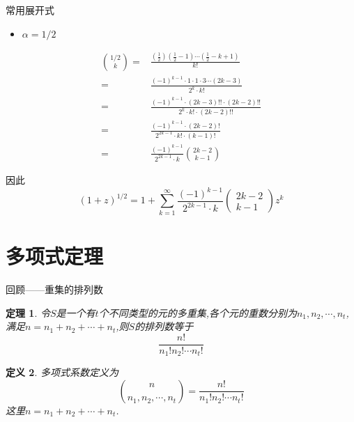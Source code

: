 \documentclass[punct]{ctexbeamer}
\newtheorem{thm}{定理}[section]
\newtheorem{defi}[thm]{定义}
\begin{document}
\begin{frame}{常用展开式}
    	\begin{itemize}
        \item $ \alpha = 1/2$
    \end{itemize}
\begin{align*}
\binom{1/2}{k}
= & \frac{\left(\frac{1}{2}\right)\left(\frac{1}{2}-1\right) \cdots\left(\frac{1}{2}-k+1\right)}{k !}\\[6pt]
= & \frac{(-1)^{k-1} \cdot 1 \cdot 1 \cdot 3 \cdots(2 k-3)}{2^{k} \cdot k !} \\[6pt]
=& \frac{(-1)^{k-1} \cdot(2 k-3) ! ! \cdot(2 k-2) ! !}{2^{k} \cdot k ! \cdot(2 k-2) ! !}\\[6pt]
= & \frac{(-1)^{k-1} \cdot(2 k-2) !}{2^{2 k-1} \cdot k ! \cdot(k-1) !} \\[6pt]
= & \frac{(-1)^{k-1}}{2^{2 k-1} \cdot k}
\binom{2 k-2}{k-1}
\end{align*}

因此
\vspace{-10pt}
    $$(1+z)^{1 / 2}=1+\sum_{k=1}^{\infty} \frac{(-1)^{k-1}}{2^{2 k-1} \cdot k}\left(\begin{array}{c}2 k-2 \\ k-1\end{array}\right) z^{k}$$



\end{frame}




\section{多项式定理}

\begin{frame}{回顾——重集的排列数}
	\begin{thm}
		令$S$是一个有$t$个不同类型的元的多重集,各个元的重数分别为$n_{1}, n_{2}, \cdots, n_{t}$,
		满足$n=n_{1}+ n_{2}+\cdots+ n_{t}$,则$S$的排列数等于
		$$
		\frac{n!}{n_{1}!n_{2}!\cdots n_{t}!}
		$$
	\end{thm}

	\begin{defi}
	多项式系数定义为
	$$
	\binom{n}{n_{1}, n_{2}, \cdots, n_{t}}=\frac{n!}{n_{1}!n_{2}!\cdots n_{t}!}
	$$
	这里$n=n_{1}+ n_{2}+\cdots+ n_{t}$.
	\end{defi}
\end{frame}
\end{document}
